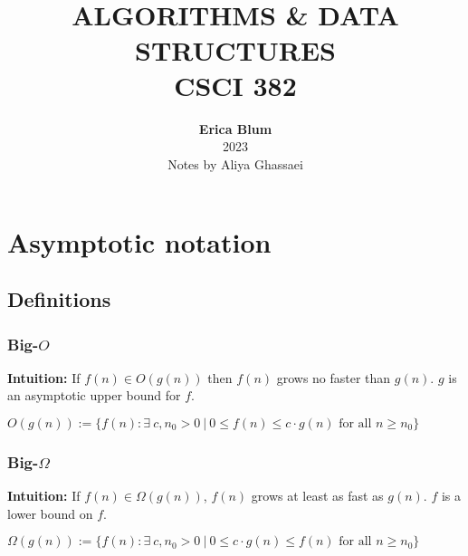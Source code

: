 \documentclass{article}
\begin{document}

\title{ \normalsize \textsc{}
		\\ [2.0cm]
		\HRule{1.5pt} \\
		\LARGE \textbf{\uppercase{Algorithms \& Data Structures}
		\HRule{2.0pt} \\ [0.6cm] \LARGE{CSCI 382} \vspace*{10\baselineskip}}
		}
\date{}
\author{\textbf{Erica Blum} \\ 
		2023\\
		Notes by Aliya Ghassaei}

\maketitle
\newpage

\tableofcontents
\newpage

\section{Asymptotic notation}
    \subsection{Definitions}

        \subsubsection{Big-$O$}
            \textbf{Intuition: }If $f(n) \in O(g(n))$ then $f(n)$ grows no faster than $g(n)$. $g$ is an asymptotic upper bound for $f$.
            \begin{definition}
                $O(g(n)) :=  \{f(n) : \exists ~ c, n_0 > 0 ~|~ 0 \leq f(n) \leq c \cdot g(n) \text{ for all } n \geq  n_0 \} $
            \end{definition}

        \subsubsection{Big-$\Omega$}
            \textbf{Intuition: }If  $f(n) \in \Omega(g(n))$, $f(n)$ grows at least as fast as $g(n)$. $f$ is a lower bound on $f$.
            \begin{definition}
                $\Omega(g(n)) := \{f(n) : \exists ~ c,n_0 > 0 ~|~ 0 \leq   c \cdot g(n) \leq f(n) \text{ for all } n \geq n_0\}$
            \end{definition}
\end{document}
